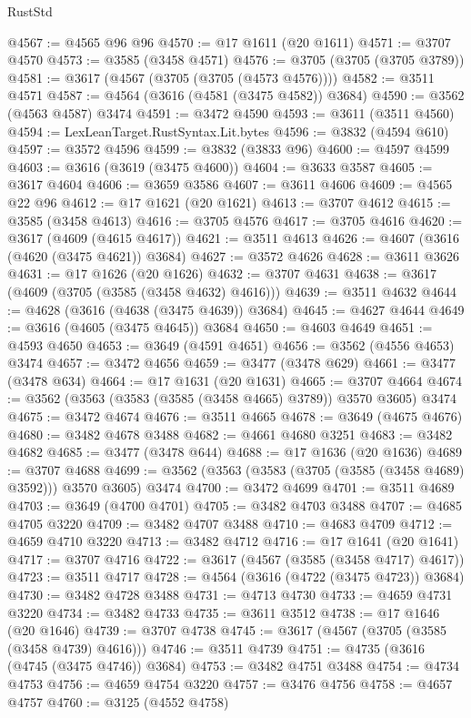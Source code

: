 \begin{lexlean}{RustStd}
\begin{coremodule}
@4567 := @4565 @96 @96
@4570 := @17 @1611 (@20 @1611)
@4571 := @3707 @4570
@4573 := @3585 (@3458 @4571)
@4576 := @3705 (@3705 (@3705 @3789))
@4581 := @3617 (@4567 (@3705 (@3705 (@4573 @4576))))
@4582 := @3511 @4571
@4587 := @4564 (@3616 (@4581 (@3475 @4582)) @3684)
@4590 := @3562 (@4563 @4587) @3474
@4591 := @3472 @4590
@4593 := @3611 (@3511 @4560)
@4594 := LexLeanTarget.RustSyntax.Lit.bytes
@4596 := @3832 (@4594 @610)
@4597 := @3572 @4596
@4599 := @3832 (@3833 @96)
@4600 := @4597 @4599
@4603 := @3616 (@3619 (@3475 @4600))
@4604 := @3633 @3587
@4605 := @3617 @4604
@4606 := @3659 @3586
@4607 := @3611 @4606
@4609 := @4565 @22 @96
@4612 := @17 @1621 (@20 @1621)
@4613 := @3707 @4612
@4615 := @3585 (@3458 @4613)
@4616 := @3705 @4576
@4617 := @3705 @4616
@4620 := @3617 (@4609 (@4615 @4617))
@4621 := @3511 @4613
@4626 := @4607 (@3616 (@4620 (@3475 @4621)) @3684)
@4627 := @3572 @4626
@4628 := @3611 @3626
@4631 := @17 @1626 (@20 @1626)
@4632 := @3707 @4631
@4638 := @3617 (@4609 (@3705 (@3585 (@3458 @4632) @4616)))
@4639 := @3511 @4632
@4644 := @4628 (@3616 (@4638 (@3475 @4639)) @3684)
@4645 := @4627 @4644
@4649 := @3616 (@4605 (@3475 @4645)) @3684
@4650 := @4603 @4649
@4651 := @4593 @4650
@4653 := @3649 (@4591 @4651)
@4656 := @3562 (@4556 @4653) @3474
@4657 := @3472 @4656
@4659 := @3477 (@3478 @629)
@4661 := @3477 (@3478 @634)
@4664 := @17 @1631 (@20 @1631)
@4665 := @3707 @4664
@4674 := @3562 (@3563 (@3583 (@3585 (@3458 @4665) @3789)) @3570 @3605) @3474
@4675 := @3472 @4674
@4676 := @3511 @4665
@4678 := @3649 (@4675 @4676)
@4680 := @3482 @4678 @3488
@4682 := @4661 @4680 @3251
@4683 := @3482 @4682
@4685 := @3477 (@3478 @644)
@4688 := @17 @1636 (@20 @1636)
@4689 := @3707 @4688
@4699 := @3562 (@3563 (@3583 (@3705 (@3585 (@3458 @4689) @3592))) @3570 @3605) @3474
@4700 := @3472 @4699
@4701 := @3511 @4689
@4703 := @3649 (@4700 @4701)
@4705 := @3482 @4703 @3488
@4707 := @4685 @4705 @3220
@4709 := @3482 @4707 @3488
@4710 := @4683 @4709
@4712 := @4659 @4710 @3220
@4713 := @3482 @4712
@4716 := @17 @1641 (@20 @1641)
@4717 := @3707 @4716
@4722 := @3617 (@4567 (@3585 (@3458 @4717) @4617))
@4723 := @3511 @4717
@4728 := @4564 (@3616 (@4722 (@3475 @4723)) @3684)
@4730 := @3482 @4728 @3488
@4731 := @4713 @4730
@4733 := @4659 @4731 @3220
@4734 := @3482 @4733
@4735 := @3611 @3512
@4738 := @17 @1646 (@20 @1646)
@4739 := @3707 @4738
@4745 := @3617 (@4567 (@3705 (@3585 (@3458 @4739) @4616)))
@4746 := @3511 @4739
@4751 := @4735 (@3616 (@4745 (@3475 @4746)) @3684)
@4753 := @3482 @4751 @3488
@4754 := @4734 @4753
@4756 := @4659 @4754 @3220
@4757 := @3476 @4756
@4758 := @4657 @4757
@4760 := @3125 (@4552 @4758)

\end{coremodule}
\end{lexlean}
